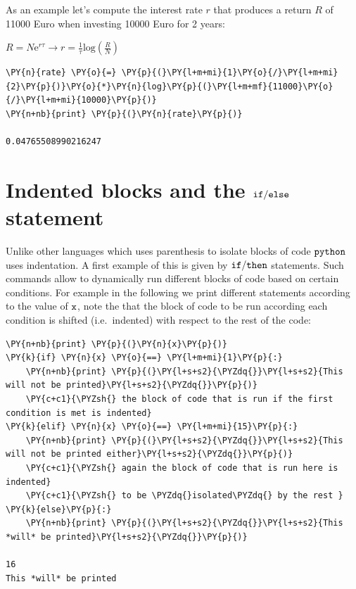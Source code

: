 As an example let's compute the interest rate \(r\) that produces a return \(R\) of 11000 Euro when investing 10000 Euro for 2 years:

\(R = N\mathrm{e}^{r\tau} \rightarrow r = \frac{1}{\tau} \mathrm{log}(\frac{R}{N})\)

\begin{tcolorbox}[breakable, size=fbox, boxrule=1pt, pad at break*=1mm, colback=cellbackground, colframe=cellborder]            
\begin{Verbatim}[commandchars=\\\{\}]
\PY{n}{rate} \PY{o}{=} \PY{p}{(}\PY{l+m+mi}{1}\PY{o}{/}\PY{l+m+mi}{2}\PY{p}{)}\PY{o}{*}\PY{n}{log}\PY{p}{(}\PY{l+m+mf}{11000}\PY{o}{/}\PY{l+m+mi}{10000}\PY{p}{)}
\PY{n+nb}{print} \PY{p}{(}\PY{n}{rate}\PY{p}{)}

0.04765508990216247
\end{Verbatim}
\end{tcolorbox}

\section{Indented blocks and the $\tt{if/else}$ statement}\label{indented-blocks-and-the-ttifelse-statement}

Unlike other languages which uses parenthesis to isolate blocks of code $\tt{python}$ uses indentation. A first example of this is given by $\tt{if/then}$ statements. Such commands allow to dynamically run different blocks of code based on certain conditions. For example in the following we print different statements according to the value of $\tt{x}$, note the that the block of code to be run according each condition is shifted (i.e.~indented) with respect to the rest of the
code:

\begin{tcolorbox}[breakable, size=fbox, boxrule=1pt, pad at break*=1mm, colback=cellbackground, colframe=cellborder]            
\begin{Verbatim}[commandchars=\\\{\}]
\PY{n+nb}{print} \PY{p}{(}\PY{n}{x}\PY{p}{)}
\PY{k}{if} \PY{n}{x} \PY{o}{==} \PY{l+m+mi}{1}\PY{p}{:} 
    \PY{n+nb}{print} \PY{p}{(}\PY{l+s+s2}{\PYZdq{}}\PY{l+s+s2}{This will not be printed}\PY{l+s+s2}{\PYZdq{}}\PY{p}{)} 
    \PY{c+c1}{\PYZsh{} the block of code that is run if the first condition is met is indented}
\PY{k}{elif} \PY{n}{x} \PY{o}{==} \PY{l+m+mi}{15}\PY{p}{:}
    \PY{n+nb}{print} \PY{p}{(}\PY{l+s+s2}{\PYZdq{}}\PY{l+s+s2}{This will not be printed either}\PY{l+s+s2}{\PYZdq{}}\PY{p}{)}
    \PY{c+c1}{\PYZsh{} again the block of code that is run here is indented}
    \PY{c+c1}{\PYZsh{} to be \PYZdq{}isolated\PYZdq{} by the rest }
\PY{k}{else}\PY{p}{:}
    \PY{n+nb}{print} \PY{p}{(}\PY{l+s+s2}{\PYZdq{}}\PY{l+s+s2}{This *will* be printed}\PY{l+s+s2}{\PYZdq{}}\PY{p}{)}

16
This *will* be printed
\end{Verbatim}
\end{tcolorbox}

